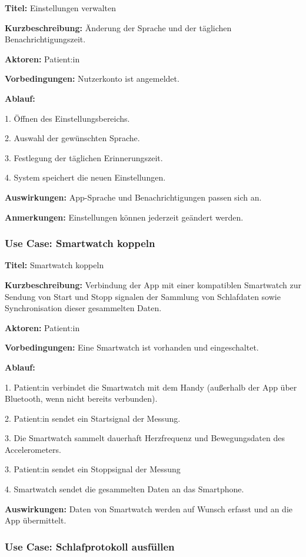 \textbf{Titel:} Einstellungen verwalten

\textbf{Kurzbeschreibung:}  
Änderung der Sprache und der täglichen Benachrichtigungszeit.

\textbf{Aktoren:}  
Patient:in

\textbf{Vorbedingungen:}  
Nutzerkonto ist angemeldet.

\textbf{Ablauf:}  

1. Öffnen des Einstellungsbereichs.

2. Auswahl der gewünschten Sprache.

3. Festlegung der täglichen Erinnerungszeit.

4. System speichert die neuen Einstellungen.

\textbf{Auswirkungen:}  
App-Sprache und Benachrichtigungen passen sich an.

\textbf{Anmerkungen:}  
Einstellungen können jederzeit geändert werden.

\clearpage 

\subsubsection*{Use Case: Smartwatch koppeln}

\textbf{Titel:} Smartwatch koppeln

\textbf{Kurzbeschreibung:}  
Verbindung der App mit einer kompatiblen Smartwatch zur Sendung von Start und Stopp signalen der Sammlung von Schlafdaten sowie Synchronisation dieser gesammelten Daten.

\textbf{Aktoren:}  
Patient:in

\textbf{Vorbedingungen:}  
Eine Smartwatch ist vorhanden und eingeschaltet.

\textbf{Ablauf:}  

1. Patient:in verbindet die Smartwatch mit dem Handy (außerhalb der App über Bluetooth, wenn nicht bereits verbunden).

2. Patient:in sendet ein Startsignal der Messung.

3. Die Smartwatch sammelt dauerhaft Herzfrequenz und Bewegungsdaten des Accelerometers.

3. Patient:in sendet ein Stoppsignal der Messung

4. Smartwatch sendet die gesammelten Daten an das Smartphone.

\textbf{Auswirkungen:}  
Daten von Smartwatch werden auf Wunsch erfasst und an die App übermittelt.


\subsubsection*{Use Case: Schlafprotokoll ausfüllen}

